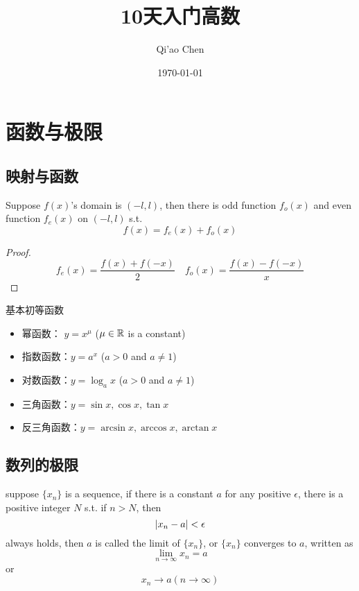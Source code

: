 \documentclass[11pt]{article}
\author{Qi'ao Chen}
\date{\today}
\title{10天入门高数}
\begin{document}
\maketitle
\tableofcontents \clearpage\section{函数与极限}
\label{sec:org5b198f0}
\subsection{映射与函数}
\label{sec:org82ac5c2}
\begin{proposition}[]
Suppose \(f(x)\)'s domain is \((-l,l)\), then there is odd function
\(f_o(x)\) and even function \(f_e(x)\) on \((-l,l)\) s.t.
\begin{equation*}
f(x)=f_e(x)+f_o(x)
\end{equation*}
\end{proposition}

\begin{proof}
\begin{equation*}
f_e(x)=\frac{f(x)+f(-x)}{2}\quad
f_o(x)=\frac{f(x)-f(-x)}{x}
\end{equation*}
\end{proof}

基本初等函数
\begin{itemize}
\item 幂函数： \(y=x^\mu\) (\(\mu\in\mathbb{R}\) is a constant)
\item 指数函数：\(y=a^x\) (\(a\iffalse<\fi>0\) and \(a\neq1\))
\item 对数函数：\(y=\log_ax\) (\(a>0\) and \(a\neq1\))
\item 三角函数：\(y=\sin x,\cos x,\tan x\)
\item 反三角函数：\(y=\arcsin x,\arccos x,\arctan x\)
\end{itemize}
\subsection{数列的极限}
\label{sec:org70c4997}
\begin{definition}[]
suppose \(\{x_n\}\) is a sequence, if there is a constant \(a\) for any
positive \(\epsilon\), there is a positive integer \(N\) s.t. if \(n>N\), then
\begin{equation*}
\abs{x_n-a}<\epsilon
\end{equation*}
always holds, then \(a\) is called the limit of \(\{x_n\}\), or \(\{x_n\}\)
converges to \(a\), written as
\begin{equation*}
\lim_{n\to\infty}x_n=a
\end{equation*}
or
\begin{equation*}
x_n\to a(n\to \infty)
\end{equation*}
\end{definition}
\end{document}
